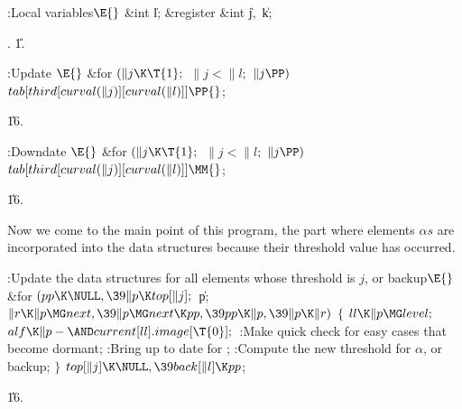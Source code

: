 \B{}:Local variables\X${}\E{}$\6
\&{int} \|l;\6
\&{register} \&{int} \|j${},{}$ \|k;\par
{}.
\U1.\fi

\B{}:Update \X${}\E{}$\6
\&{for} ${}(\|j\K\T{1};{}$ ${}\|j<\|l;{}$ ${}\|j\PP){}$\1\5
${}\\{tab}[\\{third}[\\{curval}(\|j)][\\{curval}(\|l)]]\PP{}$;\2\par
\U16.\fi

\B{}:Downdate \X${}\E{}$\6
\&{for} ${}(\|j\K\T{1};{}$ ${}\|j<\|l;{}$ ${}\|j\PP){}$\1\5
${}\\{tab}[\\{third}[\\{curval}(\|j)][\\{curval}(\|l)]]\MM{}$;\2\par
\U16.\fi

Now we come to the main point of this program, the part
where
elements $\alpha s$ are incorporated into the data structures because
their threshold value has occurred.

\Y\B\4:Update the data structures for all elements whose threshold is $j$,
or backup\X${}\E{}$\6
\&{for} ${}(\\{pp}\K\NULL,\39\|p\K\\{top}[\|j];{}$ \|p; ${}\|r\K\|p\MG\\{next},%
\39\|p\MG\\{next}\K\\{pp},\39\\{pp}\K\|p,\39\|p\K\|r){}$\5
${}\{{}$\1\6
${}\\{ll}\K\|p\MG\\{level};{}$\6
${}\\{alf}\K\|p-{\AND}\\{current}[\\{ll}].\\{image}[\T{0}];{}$\6
:Make quick check for easy cases that become dormant\X;\6
:Bring  up to date for \X;\6
:Compute the new threshold for $\alpha$, or backup\X;\6
\4${}\}{}$\2\6
${}\\{top}[\|j]\K\NULL,\39\\{back}[\|l]\K\\{pp}{}$;\par
\U16.\fi

